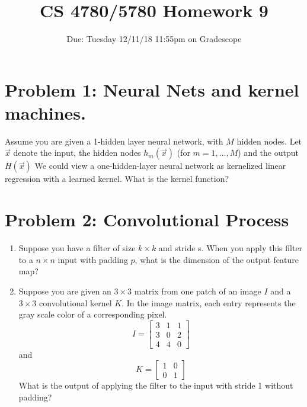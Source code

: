 \documentclass{article}
\title{CS 4780/5780 Homework 9\vspace{-10pt}}
\author{Due: Tuesday 12/11/18 11:55pm on Gradescope}
\date{}
\begin{document}
    \maketitle
    \section*{Problem 1: Neural Nets and kernel machines.}
    Assume you are given a 1-hidden layer neural network, with $M$ hidden nodes. Let $\vec{x}$ denote the input, the hidden nodes $h_{m}(\vec{x})$ (for $m=1,\dots,M$) and the output $H(\vec{x})$
    We could view a one-hidden-layer neural network as kernelized linear regression with a learned kernel. What is the kernel function?
     \section*{Problem 2: Convolutional Process}
     \begin{enumerate}
     	\item Suppose you have a filter of size $k \times k$ and stride s. When you apply this filter to a $n \times n$ input with padding $p$, what is the dimension of the output feature map? 
     	\item Suppose you are given an $3 \times 3$ matrix from one patch of an image $I$ and a $3\times 3$ convolutional kernel $K$. In the image matrix, each entry represents the gray scale color of a corresponding pixel.
     	$$I = \begin{bmatrix}
     	3 & 1&  1 \\
     	3 & 0 & 2 \\
     	4 & 4 & 0
     	\end{bmatrix}$$ and $$K = \begin{bmatrix}
     	1 & 0 \\ 0 & 1   
     	\end{bmatrix}$$
     	What is the output of applying the filter to the input with stride 1 without padding?
     \end{enumerate}
    \newpage
\end{document}
